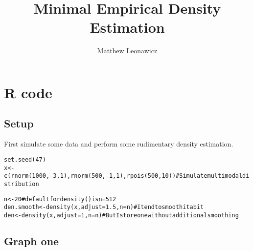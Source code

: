 \documentclass{article}\usepackage[]{graphicx}\usepackage[]{color}
\makeatletter
\newcommand{\hlnum}[1]{\textcolor[rgb]{0.863,0.196,0.184}{#1}}%
\newcommand{\hlcom}[1]{\textcolor[rgb]{0.345,0.431,0.459}{#1}}%
\newcommand{\hlopt}[1]{\textcolor[rgb]{0.576,0.631,0.631}{#1}}%
\newcommand{\hlstd}[1]{\textcolor[rgb]{0.514,0.58,0.588}{#1}}%
\newcommand{\hlkwb}[1]{\textcolor[rgb]{0.522,0.6,0}{#1}}%
\newcommand{\hlkwc}[1]{\textcolor[rgb]{0.796,0.294,0.086}{#1}}%
\newcommand{\hlkwd}[1]{\textcolor[rgb]{0.576,0.631,0.631}{#1}}%
\newenvironment{kframe}{%
 \def\at@end@of@kframe{}%
 \ifinner\ifhmode%
  \def\at@end@of@kframe{\end{minipage}}%
  \begin{minipage}{\columnwidth}%
 \fi\fi%
 \def\FrameCommand##1{\hskip\@totalleftmargin \hskip-\fboxsep
 \colorbox{shadecolor}{##1}\hskip-\fboxsep
     \hskip-\linewidth \hskip-\@totalleftmargin \hskip\columnwidth}%
 \MakeFramed {\advance\hsize-\width
   \@totalleftmargin\z@ \linewidth\hsize
   \@setminipage}}%
 {\par\unskip\endMakeFramed%
 \at@end@of@kframe}
\newenvironment{knitrout}{}{} %
\makeatother
\begin{document}
\title{Minimal Empirical Density Estimation}
\author{Matthew Leonawicz}
\maketitle





\section{R code}

\subsection{Setup}
First simulate some data and perform some rudimentary density estimation.

\begin{knitrout}
\color{fgcolor}\begin{kframe}
\begin{alltt}
\hlkwd{set.seed}\hlstd{(}\hlnum{47}\hlstd{)}
\hlstd{x} \hlkwb{<-} \hlkwd{c}\hlstd{(}\hlkwd{rnorm}\hlstd{(}\hlnum{1000}\hlstd{,} \hlopt{-}\hlnum{3}\hlstd{,} \hlnum{1}\hlstd{),} \hlkwd{rnorm}\hlstd{(}\hlnum{500}\hlstd{,} \hlopt{-}\hlnum{1}\hlstd{,} \hlnum{1}\hlstd{),} \hlkwd{rpois}\hlstd{(}\hlnum{500}\hlstd{,} \hlnum{10}\hlstd{))}  \hlcom{# Simulate multimodal distribution}

\hlstd{n} \hlkwb{<-} \hlnum{20}  \hlcom{# default for density() is n=512}
\hlstd{den.smooth} \hlkwb{<-} \hlkwd{density}\hlstd{(x,} \hlkwc{adjust} \hlstd{=} \hlnum{1.5}\hlstd{,} \hlkwc{n} \hlstd{= n)}  \hlcom{# I tend to smooth it a bit}
\hlstd{den} \hlkwb{<-} \hlkwd{density}\hlstd{(x,} \hlkwc{adjust} \hlstd{=} \hlnum{1}\hlstd{,} \hlkwc{n} \hlstd{= n)}  \hlcom{# But I store one without additional smoothing}
\end{alltt}
\end{kframe}
\end{knitrout}

\subsection{Graph one}
\end{document}
